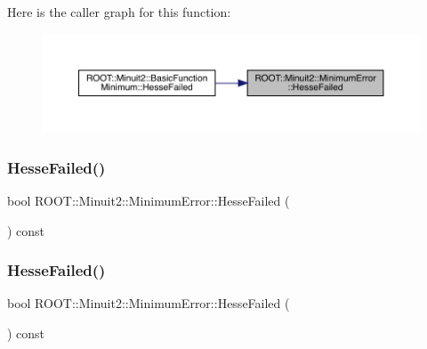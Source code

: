 Here is the caller graph for this function\+:
\nopagebreak
\begin{figure}[H]
\begin{center}
\leavevmode
\includegraphics[width=350pt]{d5/d32/classROOT_1_1Minuit2_1_1MinimumError_adf8acb6ea4137162b034eb6b9a79d9b9_icgraph}
\end{center}
\end{figure}
\mbox{\label{classROOT_1_1Minuit2_1_1MinimumError_adf8acb6ea4137162b034eb6b9a79d9b9}} 
\subsubsection{\texorpdfstring{HesseFailed()}{HesseFailed()}\hspace{0.1cm}{\footnotesize\ttfamily [2/3]}}
{\footnotesize\ttfamily bool R\+O\+O\+T\+::\+Minuit2\+::\+Minimum\+Error\+::\+Hesse\+Failed (\begin{DoxyParamCaption}{ }\end{DoxyParamCaption}) const\hspace{0.3cm}{\ttfamily [inline]}}

\mbox{\label{classROOT_1_1Minuit2_1_1MinimumError_adf8acb6ea4137162b034eb6b9a79d9b9}} 
\subsubsection{\texorpdfstring{HesseFailed()}{HesseFailed()}\hspace{0.1cm}{\footnotesize\ttfamily [3/3]}}
{\footnotesize\ttfamily bool R\+O\+O\+T\+::\+Minuit2\+::\+Minimum\+Error\+::\+Hesse\+Failed (\begin{DoxyParamCaption}{ }\end{DoxyParamCaption}) const\hspace{0.3cm}{\ttfamily [inline]}}

